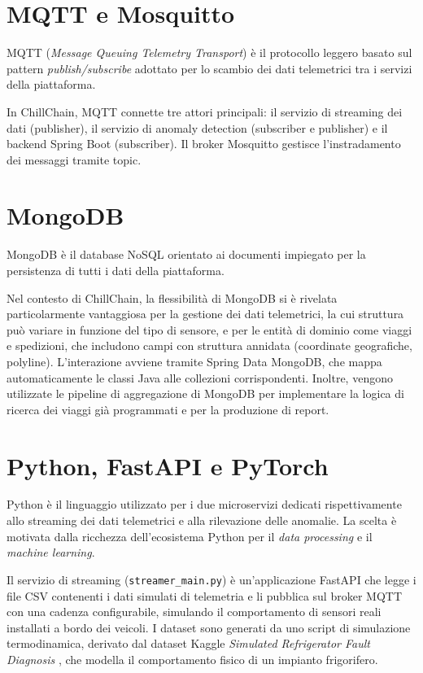 \section{MQTT e Mosquitto}

MQTT (\textit{Message Queuing Telemetry Transport}) è il protocollo leggero basato sul pattern \textit{publish/subscribe} adottato per lo scambio dei dati telemetrici tra i servizi della piattaforma.

In ChillChain, MQTT connette tre attori principali: il servizio di streaming dei dati (publisher), il servizio di anomaly detection (subscriber e publisher) e il backend Spring Boot (subscriber). Il broker Mosquitto gestisce l'instradamento dei messaggi tramite topic.
\section{MongoDB}

MongoDB è il database NoSQL orientato ai documenti impiegato per la persistenza di tutti i dati della piattaforma.

Nel contesto di ChillChain, la flessibilità di MongoDB si è rivelata particolarmente vantaggiosa per la gestione dei dati telemetrici, la cui struttura può variare in funzione del tipo di sensore, e per le entità di dominio come viaggi e spedizioni, che includono campi con struttura annidata (coordinate geografiche, polyline).  L'interazione avviene tramite Spring Data MongoDB, che mappa automaticamente le classi Java alle collezioni corrispondenti. Inoltre, vengono utilizzate le pipeline di aggregazione di MongoDB per implementare la logica di ricerca dei viaggi già programmati e per la produzione di report.

\section{Python, FastAPI e PyTorch}

Python è il linguaggio utilizzato per i due microservizi dedicati rispettivamente allo streaming dei dati telemetrici e alla rilevazione delle anomalie. La scelta è motivata dalla ricchezza dell'ecosistema Python per il \textit{data processing} e il \textit{machine learning}.

Il servizio di streaming (\texttt{streamer\_main.py}) è un'applicazione FastAPI che legge i file CSV contenenti i dati simulati di telemetria e li pubblica sul broker MQTT con una cadenza configurabile, simulando il comportamento di sensori reali installati a bordo dei veicoli. I dataset sono generati da uno script di simulazione termodinamica, derivato dal dataset Kaggle \textit{Simulated Refrigerator Fault Diagnosis} \cite{kaggle_fridge}, che modella il comportamento fisico di un impianto frigorifero.


